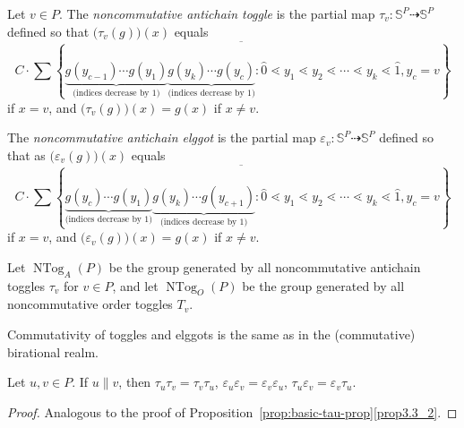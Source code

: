 \documentclass[ALCO,ThmDefs,Unicode,epreuves]{cedram}
\newcommand{\defn}[1]{\emph{#1}}
\newcommand{\bbs}{\mathbb{S}}
\newcommand{\e}{\varepsilon}
\newcommand{\dra}{\dashrightarrow}
\DeclareMathOperator{\ntog}{NTog}
\begin{document}
\begin{defi}
Let $v\in P$. The \defn{noncommutative antichain toggle} is the partial map $\tau_v:\bbs^P \dra \bbs^P$ defined so that $\big(\tau_v(g)\big)(x)$ equals
\[
C \cdot \overline{
\sum\left\{\underbrace{g(y_{c-1})\cdots g(y_1)}_{\text{(indices decrease by 1)}}
\underbrace{g(y_{k})\cdots g(y_c)}_{\text{(indices decrease by 1)}} : \widehat{0}\lessdot y_1\lessdot y_2 \lessdot
\cdots \lessdot y_k\lessdot \widehat{1}, y_c=v
\right\}}
\]
if $x=v$, and $\big(\tau_v(g)\big)(x)=g(x)$ if $x\not=v$.

The \defn{noncommutative antichain elggot} is the partial map $\e_v:\bbs^P \dra \bbs^P$ defined so that as $\big(\e_v(g)\big)(x)$ equals
\[
C \cdot \overline{
\sum\left\{\underbrace{g(y_c)\cdots g(y_1)}_{\text{(indices decrease by 1)}}
\underbrace{g(y_{k})\cdots g(y_{c+1})}_{\text{(indices decrease by 1)}} : \widehat{0}\lessdot y_1\lessdot y_2
\lessdot
\cdots \lessdot y_k\lessdot \widehat{1}, y_c=v
\right\}}
\] 
if $x=v$, and $\big(\e_v(g)\big)(x)=g(x)$ if $x\not=v$.

Let $\ntog_A(P)$ be the group generated by all noncommutative antichain toggles $\tau_v$ for $v\in P$, and let $\ntog_O(P)$ be the group generated by all noncommutative order toggles $T_v$.
\end{defi}

Commutativity of toggles and elggots is the same as in the (commutative) birational realm.

\begin{prop}
Let $u,v\in P$. If $u \parallel v$, then
$\tau_u \tau_v= \tau_v \tau_u$, $ \e_u \e_v= \e_v \e_u$, $ \tau_u \e_v= \e_v \tau_u$.
\end{prop}
\begin{proof}
Analogous to the proof of Proposition~\ref{prop:basic-tau-prop}\ref{prop3.3_2}. 
\end{proof}
\end{document}
